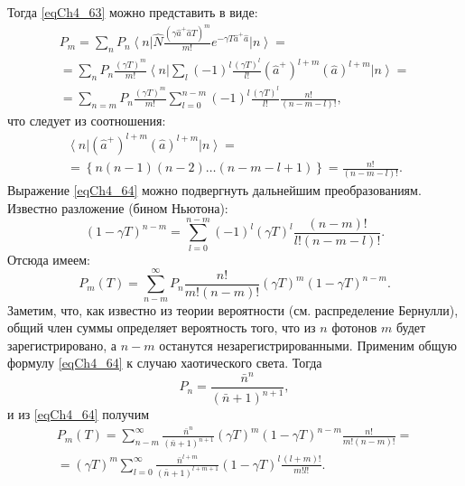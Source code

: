 Тогда \eqref{eqCh4_63} можно представить в виде:
\begin{eqnarray}
P_m = \sum_n P_n 
\left<n\right|
\hat{N}
\frac{\left(\gamma \hat{a}^{+} \hat{a} T\right)^m}{m!}
e^{- \gamma T \hat{a}^{+} \hat{a}}
\left|n\right> = 
\nonumber \\
=
\sum_n P_n 
\frac{\left(\gamma T\right)^m}{m!}
\left<n\right|
\sum_l\left(-1\right)^l
\frac{\left(\gamma T\right)^l}{l!}
\left(\hat{a}^{+}\right)^{l + m}
\left(\hat{a}\right)^{l + m}
\left|n\right> = 
\nonumber \\
=
\sum_{n = m}
P_n 
\frac{\left(\gamma T\right)^m}{m!}
\sum_{l = 0}^{n - m}\left(-1\right)^l
\frac{\left(\gamma T\right)^l}{l!}
\frac{n!}{\left(n - m - l\right)!},
\label{eqCh4_64}
\end{eqnarray}
что следует из соотношения:
\begin{eqnarray}
\left<n\right|
\left(\hat{a}^{+}\right)^{l + m}
\left(\hat{a}\right)^{l + m}
\left|n\right> = 
\nonumber \\
= \left\{
n \left(n - 1\right)\left(n - 2\right) \dotsc
\left(n - m - l + 1\right)
\right\} = 
\frac{n!}{\left(n - m - l\right)!}.
\nonumber
\end{eqnarray}
Выражение \eqref{eqCh4_64} можно подвергнуть дальнейшим
преобразованиям. Известно разложение (бином Ньютона): 
\[
\left(1 - \gamma T\right)^{n - m} = 
\sum_{l = 0}^{n -m}
\left(-1\right)^l
\left(\gamma T\right)^l
\frac{\left(n - m\right)!}{l!\left(n - m - l\right)!}.
\]
Отсюда имеем:
\begin{equation}
P_m\left(T\right) = 
\sum_{n - m}^{\infty}
P_n 
\frac{n!}{m!\left(n - m\right)!}
\left(\gamma T\right)^m
\left(1 - \gamma T\right)^{n - m}.
\label{eqCh4_64a}
\end{equation}
Заметим, что, как известно из теории вероятности (см. распределение
Бернулли), общий член суммы определяет вероятность того, что из $n$
фотонов $m$ будет зарегистрировано, а  $n - m$  останутся
незарегистрированными. Применим общую формулу \eqref{eqCh4_64} к случаю
хаотического света. Тогда  
\[
P_n = \frac{\bar{n}^n}{\left(\bar{n} + 1\right)^{n + 1}},
\]
и из \eqref{eqCh4_64} получим 
\begin{eqnarray}
P_m\left(T\right) = 
\sum_{n - m}^{\infty}
\frac{\bar{n}^n}{\left(\bar{n} + 1\right)^{n + 1}}
\left(\gamma T\right)^m
\left(1 - \gamma T\right)^{n - m} 
\frac{n!}{m!\left(n - m\right)!}
=
\nonumber \\
=
\left(\gamma T\right)^m
\sum_{l = 0}^{\infty}
\frac{\bar{n}^{l + m}}{\left(\bar{n} + 1\right)^{l + m + 1}}
\left(1 - \gamma T\right)^{l}
\frac{\left(l + m\right)!}{m! l!}. 
\label{eqCh4_65}
\end{eqnarray}

